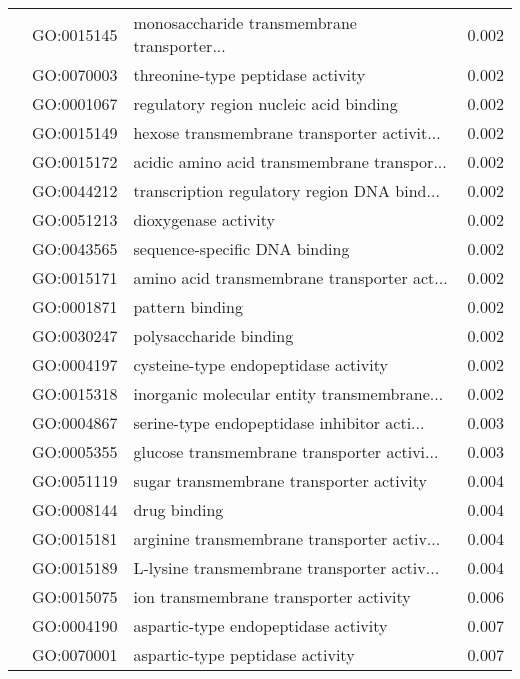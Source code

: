 \begin{longtable}{lllr}
   & GO:0015145 &  monosaccharide transmembrane transporter... &         0.002 \\
   & GO:0070003 &            threonine-type peptidase activity &         0.002 \\
   & GO:0001067 &       regulatory region nucleic acid binding &         0.002 \\
   & GO:0015149 &  hexose transmembrane transporter activit... &         0.002 \\
   & GO:0015172 &  acidic amino acid transmembrane transpor... &         0.002 \\
   & GO:0044212 &  transcription regulatory region DNA bind... &         0.002 \\
   & GO:0051213 &                         dioxygenase activity &         0.002 \\
   & GO:0043565 &                sequence-specific DNA binding &         0.002 \\
   & GO:0015171 &  amino acid transmembrane transporter act... &         0.002 \\
   & GO:0001871 &                              pattern binding &         0.002 \\
   & GO:0030247 &                       polysaccharide binding &         0.002 \\
   & GO:0004197 &         cysteine-type endopeptidase activity &         0.002 \\
   & GO:0015318 &  inorganic molecular entity transmembrane... &         0.002 \\
   & GO:0004867 &  serine-type endopeptidase inhibitor acti... &         0.003 \\
   & GO:0005355 &  glucose transmembrane transporter activi... &         0.003 \\
   & GO:0051119 &     sugar transmembrane transporter activity &         0.004 \\
   & GO:0008144 &                                 drug binding &         0.004 \\
   & GO:0015181 &  arginine transmembrane transporter activ... &         0.004 \\
   & GO:0015189 &  L-lysine transmembrane transporter activ... &         0.004 \\
   & GO:0015075 &       ion transmembrane transporter activity &         0.006 \\
   & GO:0004190 &         aspartic-type endopeptidase activity &         0.007 \\
   & GO:0070001 &             aspartic-type peptidase activity &         0.007 \\

\end{longtable}

